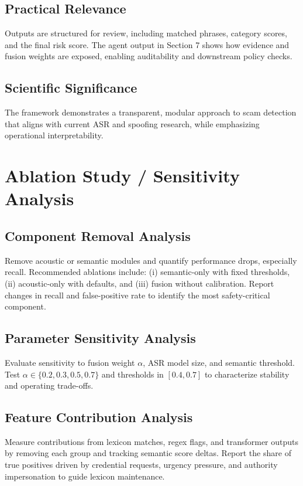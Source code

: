 \documentclass[11pt,a4paper]{article}
\begin{document}
\subsection{Practical Relevance}
Outputs are structured for review, including matched phrases, category scores, and the final risk score. The agent output in Section 7 shows how evidence and fusion weights are exposed, enabling auditability and downstream policy checks.

\subsection{Scientific Significance}
The framework demonstrates a transparent, modular approach to scam detection that aligns with current ASR and spoofing research, while emphasizing operational interpretability.

\section{Ablation Study / Sensitivity Analysis}
\subsection{Component Removal Analysis}
Remove acoustic or semantic modules and quantify performance drops, especially recall. Recommended ablations include: (i) semantic-only with fixed thresholds, (ii) acoustic-only with defaults, and (iii) fusion without calibration. Report changes in recall and false-positive rate to identify the most safety-critical component.

\subsection{Parameter Sensitivity Analysis}
Evaluate sensitivity to fusion weight $\alpha$, ASR model size, and semantic threshold. Test $\alpha \in \{0.2, 0.3, 0.5, 0.7\}$ and thresholds in $[0.4, 0.7]$ to characterize stability and operating trade-offs.

\subsection{Feature Contribution Analysis}
Measure contributions from lexicon matches, regex flags, and transformer outputs by removing each group and tracking semantic score deltas. Report the share of true positives driven by credential requests, urgency pressure, and authority impersonation to guide lexicon maintenance.
\end{document}
